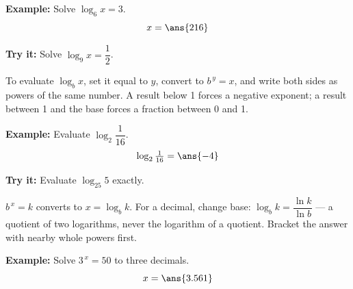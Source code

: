 \documentclass[12pt]{article}
\begin{document}
\begin{examplebox}
\textbf{Example:} Solve $\log_6 x = 3$.
\[ x = \ans{216} \]
\end{examplebox}

\begin{tryitbox}
\textbf{Try it:} Solve $\log_9 x = \dfrac{1}{2}$.\\[2pt]
\end{tryitbox}


\begin{formulabox}
To evaluate $\log_b x$, set it equal to $y$, convert to $b^{\,y} = x$, and write
both sides as powers of the same number. A result below 1 forces a negative
exponent; a result between 1 and the base forces a fraction between 0 and 1.
\end{formulabox}

\begin{examplebox}
\textbf{Example:} Evaluate $\log_2 \dfrac{1}{16}$.
\[ \log_2 \tfrac{1}{16} = \ans{-4} \]
\end{examplebox}

\begin{tryitbox}
\textbf{Try it:} Evaluate $\log_{25} 5$ exactly.\\[2pt]
\end{tryitbox}


\begin{formulabox}
$b^{\,x} = k$ converts to $x = \log_b k$. For a decimal, change base:
$\log_b k = \dfrac{\ln k}{\ln b}$ --- a quotient of two logarithms, never the
logarithm of a quotient. Bracket the answer with nearby whole powers first.
\end{formulabox}

\begin{examplebox}
\textbf{Example:} Solve $3^{\,x} = 50$ to three decimals.
\[ x = \ans{3.561} \]
\end{examplebox}
\end{document}
